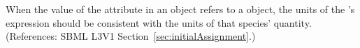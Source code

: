 When the value of the attribute  in an \InitialAssignment
object refers to a \Species object, the units of the \InitialAssignment's
 expression should be consistent with the units of that
species' quantity.  (References: SBML L3V1
Section~\ref{sec:initialAssignment}.)
